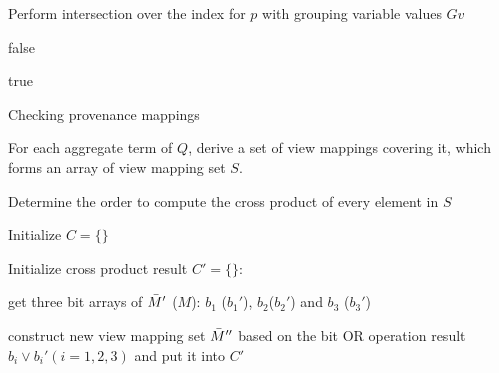 \begin{example}
\begin{algorithm}[h!]
{{{        }
        
        Perform intersection over the index for $p$ with grouping variable values $Gv$
        
        {
            \Return false
        }
    }
    
}

\Return true



 \caption{Checking provenance mappings}
 \label{reasoning_valid_view_mappings}
 \end{algorithm}





\begin{algorithm}[h!] 
\footnotesize

 
 For each aggregate term of $Q$, derive a set of view mappings covering it, which forms an array of view mapping set $S$. 
 
 
 Determine the order to compute the cross product of every element in $S$
 
 Initialize $C = \{\}$
 
 {
    
    Initialize cross product result $C' = \{\}$:
    
    {
        {
            get three bit arrays of $\Bar{M}'$ ($M$): $b_1$ ($b_1'$), $b_2$($b_2'$) and $b_3$ ($b_3'$)
            
            construct new view mapping set $\Bar{M}''$ based on the bit OR operation result $b_i \lor b_i' (i=1,2,3)$ and put it into $C'$
        }
    }
    
}
\end{algorithm}
\end{example}
